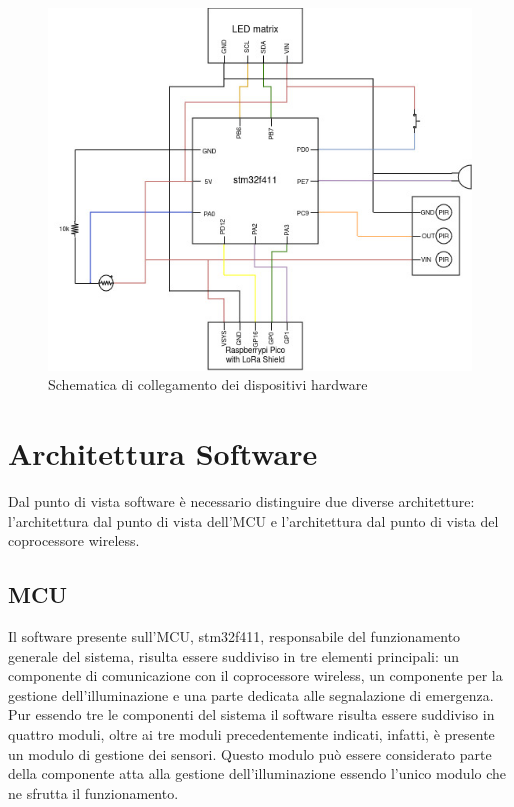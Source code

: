\documentclass{article}
\begin{document}
	\begin{figure}[ht]
		\centering
		\includegraphics[scale=0.50]{./images/Hardware_schematic.jpg}
		\caption{Schematica di collegamento dei dispositivi hardware}
		\label{img:hw}
	\end{figure}
	\newpage
	
	\section{Architettura Software}
	Dal punto di vista software \`e necessario distinguire due diverse architetture: l'architettura dal punto di vista dell'MCU e l'architettura dal punto di vista del coprocessore wireless.
	
	\subsection{MCU}
	Il software presente sull'MCU, stm32f411, responsabile del funzionamento generale del sistema, risulta essere suddiviso in tre elementi principali: un componente di comunicazione con il coprocessore wireless, un componente per la gestione dell'illuminazione e una parte dedicata alle segnalazione di emergenza.
	Pur essendo tre le componenti del sistema il software risulta essere suddiviso in quattro moduli, oltre ai tre moduli precedentemente indicati, infatti, \`e presente un modulo di gestione dei sensori. Questo modulo pu\`o essere considerato parte della componente atta alla gestione dell'illuminazione essendo l'unico modulo che ne sfrutta il funzionamento.
	
\end{document}
